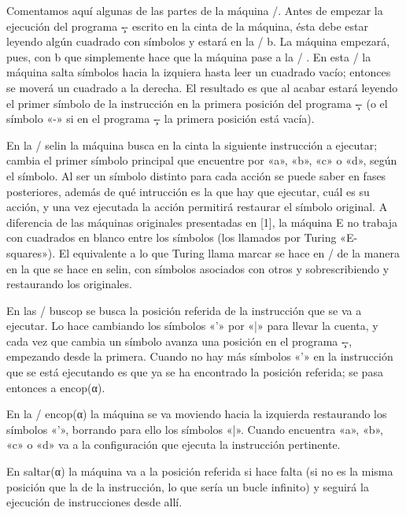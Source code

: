 %
Comentamos aquí algunas de las partes de la máquina \E/. Antes de empezar
la ejecución del programa \c-- escrito en la cinta de la máquina, ésta debe estar leyendo algún
cuadrado con símbolos y estará en la \configuration/ {\ffraktur b}. La máquina empezará, pues, con
\encaje
{\mconfig b}    {}%
\finencaje
que simplemente hace que la máquina pase a la \configuration/ {}. En
esta \configuration/ la máquina salta símbolos hacia la izquiera hasta leer un cuadrado vacío;
entonces se moverá un cuadrado a la derecha. El resultado es que al acabar estará leyendo el primer
símbolo de la instrucción en la primera posición del programa \c-- (o el símbolo «-» si en el
programa \c-- la primera posición está vacía).

En la \configuration/ {\ffraktur selin} la máquina busca en la cinta la siguiente instrucción a
ejecutar; cambia el primer símbolo principal que encuentre por «a», «b», «c» o «d», según el
símbolo. Al ser un símbolo distinto para cada acción se puede saber en fases posteriores, además de
qué intrucción es la que hay que ejecutar, cuál es su acción, y una vez ejecutada la acción
permitirá restaurar el símbolo original. A diferencia de las máquinas originales presentadas en [1],
la máquina {\machine E} no trabaja con cuadrados en blanco entre los símbolos (los llamados por
Turing «E-squares»). El equivalente a lo que Turing llama marcar se hace en \E/ de la manera en la que
se hace en {\ffraktur selin}, con símbolos asociados con otros y sobrescribiendo y restaurando los
originales.

En las \configuration/ {\ffraktur buscop} se busca la posición referida de la
instrucción que se va a ejecutar. Lo hace cambiando los símbolos «'» por «|» para llevar la cuenta,
y cada vez que cambia un símbolo avanza una posición en el programa \c--, empezando desde la
primera. Cuando no hay más símbolos «'» en la ins\-trucción que se está ejecutando es que ya se ha
encontrado la posición referida; se pasa entonces a {\ffraktur encop({\fcode α})}.

En la \configuration/ {\ffraktur encop({\fcode α})} la máquina se va moviendo hacia la izquierda
restaurando los símbolos «'», borrando para ello los símbolos «|». Cuando encuentra «a», «b», «c» o
«d» va a la configuración que ejecuta la instrucción pertinente.

En {\ffraktur saltar({\fcode α})} la máquina va a la posición referida si hace falta (si no es la
misma posición que la de la instrucción, lo que sería un bucle infinito) y seguirá la ejecución de
instrucciones desde allí.

